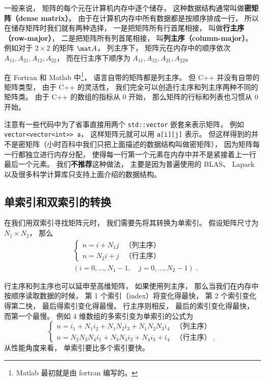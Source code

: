 

一般来说， 矩阵的每个元在计算机内存中逐个储存， 这种数据结构通常叫做\textbf{密矩阵（dense matrix）}。 由于在计算机内存中所有数据都是按顺序排成一行， 所以在储存矩阵时我们就有两种选择， 一是把矩阵所有行首尾相接， 叫做\textbf{行主序（row-major）}， 二是把矩阵所有列首尾相接， 叫\textbf{列主序（column-major）}。 例如对于 $2 \times 2$ 的矩阵 $\mat A$， 列主序下， 矩阵元在内存中的顺序依次 $A_{11}, A_{21}, A_{12}, A_{22}$， 而在行主序下顺序为 $A_{11},A_{12},A_{21},A_{22}$。

在 Fortran 和 Matlab 中\footnote{Matlab 最初就是由 fortran 编写的。}， 语言自带的矩阵都是列主序。 但 C++ 并没有自带的矩阵类型， 由于 C++ 的灵活性， 我们完全可以创造行主序和列主序两种不同的矩阵类。 由于 C++ 的数组的指标从 0 开始， 那么矩阵的行标和列表也习惯从 0 开始。

注意有一些代码中为了省事直接用两个 \verb|std::vector| 嵌套来表示矩阵， 例如 \verb|vector<vector<int>> a|， 这样矩阵元就可以用 \verb|a[i][j]| 表示。 但这样得到的并不是密矩阵（小时百科中我们只把上面描述的数据结构叫做密矩阵）， 因为矩阵每一行都独立进行内存分配， 使得每一行第一个元素在内存中并不是紧接着上一行最后一个元素。 我们\textbf{不推荐}这种做法， 主要是因为普遍使用的 BLAS、 Lapack 以及很多科学计算库只支持上面介绍的数据结构。

\subsection{单索引和双索引的转换}
在我们用双索引寻找矩阵元时， 我们需要先将其转换为单索引。 假设矩阵尺寸为 $N_1 \times N_2$， 那么
\begin{equation}
\begin{aligned}
&\begin{cases}
n = i + N_1 j  &\text{（列主序）}\\
n = N_2 i + j  &\text{（行主序）}
\end{cases}\\
&(i = 0, \dots, N_1-1,\quad j = 0, \dots, N_2-1)~.
\end{aligned}
\end{equation}

行主序和列主序也可以延申至高维矩阵， 如果使用列主序， 那么当我们在内存中按顺序读取数据的时候， 第 1 个索引（index）将变化得最快， 第 2 个索引变化得第二快， 最后得索引变化得最慢。 行主序则相反， 最后的索引变化得最快， 而第一个最慢。 例如 4 维数组的多索引变为单索引的公式为
\begin{equation}
\begin{cases}
n = i_1 + N_1 i_2 + N_1 N_2 i_3 + N_1 N_2 N_3 i_4  &\text{（列主序）}\\
n = N_2 N_3 N_4 i_1 + N_3 N_4 i_2 + N_4 i_3 + i_4  &\text{（行主序）} ~.
\end{cases}
\end{equation}
从性能角度来看， 单索引要比多个索引要快。

